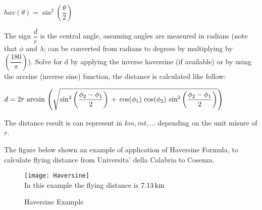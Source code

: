 \documentclass[tesi]{subfiles}
\begin{document}
\begin{center}
$hav(\theta) = \sin^{2} \left(\dfrac{\theta}{2}\right)$
\end{center}

The sign $\dfrac{d}{r}$ is the central angle, assuming angles are measured in radians (note that $\phi$ and $\lambda$; can be converted from radians to degrees by multiplying by $\left(\dfrac{180}{\pi}\right)$).
Solve for d by applying the inverse haversine (if available) or by using the arcsine (inverse sine) function, the distance is calculated like follow:

\begin{center}
 $d = 2r \thinspace \arcsin \thinspace \left(\sqrt{\sin^{2} \left(\dfrac{\phi_{2} - \phi_{1}}{2}\right) \thinspace + \thinspace \cos (\phi_{1}) \thinspace \cos(\phi_{2}) \thinspace \sin^{2} \left(\dfrac{\phi_{2} - \phi_{1}}{2}\right) }\right) $
\end{center}
The distance result is can represent in $km, mt, ...$ depending on the unit misure of $r$.

The figure below shown an example of application of Haversine Formula, to calculate flying distance from Universita' della Calabria to Cosenza.

\begin{figure}[H]	
\centering
\texttt{[image: Haversine]} 
\\In this example the flying distance is $7.13 \thinspace \si{km}$
 \caption{Haversine Example}
  \label{fig:Haversine Example}
\end{figure}
\end{document}
